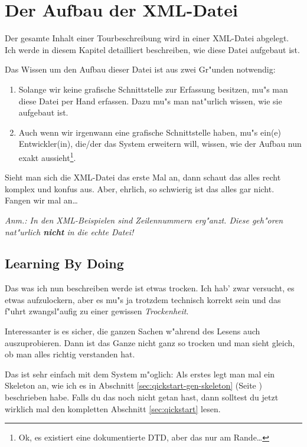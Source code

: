 \section{Der Aufbau der  XML-Datei}\label{sec:xml-structure} 

Der gesamte Inhalt einer Tourbeschreibung wird in einer XML-Datei abgelegt.
Ich werde in diesem Kapitel detailliert beschreiben, wie diese Datei aufgebaut
ist.

Das Wissen um den Aufbau dieser Datei ist aus zwei Gr"unden notwendig:
\begin{enumerate}
\item Solange wir keine grafische Schnittstelle zur Erfassung besitzen, mu"s
      man diese Datei per Hand erfassen. Dazu mu"s man nat"urlich wissen, wie
      sie aufgebaut ist.
\item Auch wenn wir irgenwann eine grafische Schnittstelle haben, mu"s ein(e)
      Entwickler(in), die/der das System erweitern will, wissen, wie der Aufbau
      nun exakt aussieht\footnote{Ok, es existiert eine dokumentierte DTD, aber 
      das nur am Rande\ldots}.
\end{enumerate}

Sieht man sich die XML-Datei das erste Mal an, dann schaut das alles recht 
komplex und konfus aus. Aber, ehrlich, so schwierig ist das alles gar nicht.
Fangen wir mal an\ldots

\textit{Anm.: In den XML-Beispielen sind Zeilennummern erg"anzt. Diese geh"oren 
nat"urlich \textbf{nicht} in die echte Datei!
}

\subsection{Learning By Doing}
Das was ich nun beschreiben werde ist etwas trocken. Ich hab' zwar versucht,
es etwas aufzulockern, aber es mu"s ja trotzdem technisch korrekt sein und
das f"uhrt zwangsl"aufig zu einer gewissen \textit{Trockenheit}.

Interessanter is es sicher, die ganzen Sachen w"ahrend des Lesens auch
auszuprobieren. Dann ist das Ganze nicht ganz so trocken und man sieht
gleich, ob man alles richtig verstanden hat.

Das ist sehr einfach mit dem System m"oglich: Als erstes legt man mal ein
Skeleton an, wie ich es in Abschnitt \ref{sec:qickstart-gen-skeleton} 
(Seite \pageref{sec:qickstart-gen-skeleton}) beschrieben habe. Falls
du das noch nicht getan hast, dann solltest du jetzt wirklich mal
den kompletten Abschnitt \ref{sec:qickstart} lesen.

